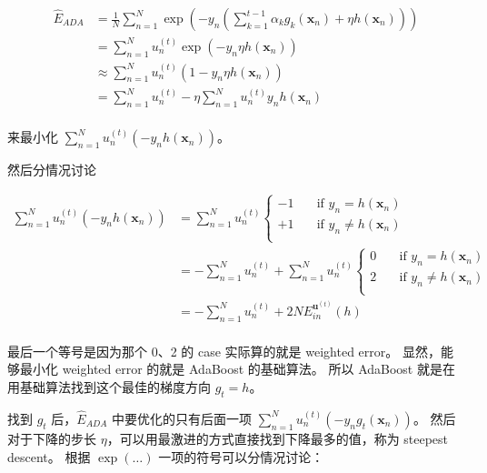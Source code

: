 \documentclass[a4paper]{article}
\begin{document}
\begin{equation}
\begin{aligned}
\widehat{E}_{ADA} &= \frac{1}{N}\sum_{n=1}^{N}\exp\left (-y_n \left (\sum_{k=1}^{t-1}\alpha_k g_k(\mathbf{x}_n) + \eta h(\mathbf{x}_n) \right ) \right ) \\
                  &= \sum_{n=1}^{N} u_n^{(t)}\exp(-y_n\eta h(\mathbf{x}_n)) \\
                  &\approx \sum_{n=1}^{N} u_n^{(t)}(1 - y_n\eta h(\mathbf{x}_n)) \\
                  &= \sum_{n=1}^{N} u_n^{(t)} - \eta \sum_{n=1}^{N} u_n^{(t)}y_n h(\mathbf{x}_n) \\
\end{aligned}
\end{equation}

来最小化 $\displaystyle \sum_{n=1}^{N}u_n^{(t)}(-y_n h(\mathbf{x}_n))$。

然后分情况讨论

\begin{equation}
\begin{aligned}
\sum_{n=1}^{N}u_n^{(t)}(-y_n h(\mathbf{x}_n)) &= \sum_{n=1}^{N}u_n^{(t)}
  \begin{cases}
    -1 & \quad \text{if } y_n =   h(\mathbf{x}_n) \\
    +1 & \quad \text{if } y_n \ne h(\mathbf{x}_n) \\
  \end{cases} \\
                                              &= -\sum_{n=1}^{N}u_n^{(t)} + \sum_{n=1}^{N}u_n^{(t)}
  \begin{cases}
    0 & \quad \text{if } y_n =   h(\mathbf{x}_n) \\
    2 & \quad \text{if } y_n \ne h(\mathbf{x}_n) \\
  \end{cases} \\
                                              &= -\sum_{n=1}^{N}u_n^{(t)} + 2N E_{in}^{\mathbf{u}^{(t)}}(h) \\
\end{aligned}
\end{equation}

最后一个等号是因为那个 0、2 的 case 实际算的就是 weighted error。
显然，能够最小化 weighted error 的就是 AdaBoost 的基础算法。
所以 AdaBoost 就是在用基础算法找到这个最佳的梯度方向 $g_t = h$。

找到 $g_t$ 后，$\widehat{E}_{ADA}$ 中要优化的只有后面一项 $\displaystyle \sum_{n=1}^{N}u_n^{(t)}(-y_n g_t(\mathbf{x}_n))$。
然后对于下降的步长 $\eta$，可以用最激进的方式直接找到下降最多的值，称为 steepest descent。
根据 $\exp(\dots)$ 一项的符号可以分情况讨论：
\end{document}
